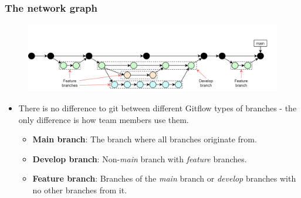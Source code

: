 \documentclass[aspectratio=169]{beamer}
\begin{document}
\begin{frame}
	\frametitle{The network graph}

	\vspace{-.5cm}
	\begin{minipage}[t][5cm][t]{\textwidth}
		\begin{figure}
			\centering
			\includegraphics[width=\textwidth]{./img/dime-gitflow-network-names.png}
		\end{figure}
	\end{minipage}

	\vspace{-1cm}
	\begin{minipage}[t][5cm][t]{\textwidth}
		\begin{itemize}
			\setlength\itemsep{.4em}
			\item There is no difference to git between
			different Gitflow types of branches
			- the only difference is how team members use them.
			\begin{itemize}
				\setlength\itemsep{.5em}
				\item \textbf{Main branch}:
				The branch where all branches originate from.
				\item \textbf{Develop branch}:
				Non-\textit{main} branch with \textit{feature} branches.
				\item \textbf{Feature branch}:
				Branches of the \textit{main} branch or
				\textit{develop} branches with no other branches from it.
			\end{itemize}
		\end{itemize}
	\end{minipage}
\end{frame}
\end{document}
